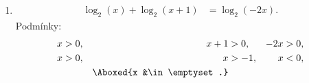 \documentclass[11pt,a4paper]{article}
\begin{document}
        \begin{enumerate}
            
            \item \begin{align*}
                \log_2(x) + \log_2(x+1) &= \log_2(-2x).
            \end{align*}
            Podmínky:
            \begin{align*}
                x &> 0,
            &
                x+1 &> 0,
            &
                -2x &> 0,
            \\
                x &> 0,
            &
                x &> -1,
            &
                x &< 0,
            \\
                &
            &
                \Aboxed{x &\in \emptyset.}
            &
                &
            \end{align*}


\end{enumerate}
\end{document}
